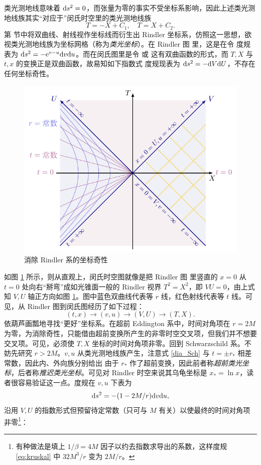 类光测地线意味着 $\dd s^2=0$，而张量为零的事实不受坐标系影响，因此上述类光测地线族其实“对应于”闵氏时空里的类光测地线族
\[
T=-X+C_1,\quad T=X+C_2.
\]
第  节中将双曲线、射线视作坐标线而衍生出 Rindler 坐标系，仿照这一思想，欲视类光测地线族为坐标网格（称为\textit{类光坐标}）。在 Rindler 图  里，这是在令
度规表为 $\dd s^2=-\mathrm{e}^{v-u}\dd v\dd u$。而在闵氏图里是令
或
这有双曲函数的形式，而 $T,X$ 与 $t,x$ 的变换正是双曲函数，故易知如下指数式
度规现表为 $\dd s^2=-\dd V\dd U$，不存在任何坐标奇性。
\begin{figure}[h!]
    \centering
    \includegraphics[width=.6\textwidth]{fig/chpt02/rindler.pdf}
    \caption{消除 Rindler 系的坐标奇性}
    \label{fig:rindlerIM}
\end{figure}
如图 \ref{fig:rindlerIM} 所示，则从直观上，闵氏时空图就像是把 Rindler 图 里竖直的 $x=0$ 从 $t=0$ 处向右“掰弯”成如光锥面一般的 Rindler 视界 $T^2=X^2$，即 $VU=0$，由上式知 $V,U$ 轴正方向如图 \ref{fig:rindlerIM}。图中蓝色双曲线代表等 $r$ 线，红色射线代表等 $t$ 线。可见，从 Rindler 图到闵氏图经历了如下过程：
\[
(t,x)\to(v,u)\to(V,U)\to(T,X).
\]
依葫芦画瓢地寻找“更好”坐标系。在超前 Eddington 系中，时间对角项在 $r=2M$ 为零，为消除奇性，只能借由超前变换所产生的非零时空交叉项，但我们并不想要交叉项。可见，必须使 $T,X$ 坐标的时间对角项非零。回到 Schwarzschild 系。不妨先研究 $r>2M$。$v,u$ 从类光测地线族产生，注意式 \eqref{dia_Sch} 与 $t=\pm r_*$ 相差常数，因此内、外向族分别给出
由于 $r_*$ 作了超前变换，因此前者称\textit{超前类光坐标}，后者称\textit{推迟类光坐标}。可见对 Rindler 时空来说其乌龟坐标是 $x_*=\ln x$，读者很容易验证这一点。度规在 $v,u$ 下表为
\[
\dd s^2=-(1-2M/r)\dd v\dd u,
\]
沿用 $V,U$ 的指数形式但预留待定常数（只可与 $M$ 有关）以使最终的时间对角项非零\footnote{有种做法是填上 $1/\beta=4M$ 因子以约去指数求导出的系数，这样度规 \eqref{eq:kruskal} 中 ${32M^3}/{r}$ 变为 $2M/r$。}：
